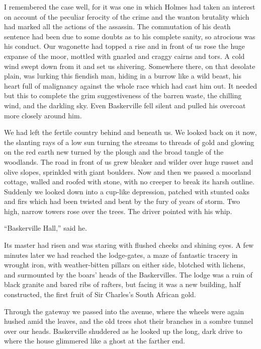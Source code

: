 \documentclass[paper=5.5in:8.5in,BCOR=7mm,twoside,DIV=calc,12pt,usegeometry,openany,chapterprefix,endperiod,headings=big]{scrbook} %
\begin{document}
I remembered the case well, for it was one in which Holmes had taken an interest on account of the peculiar ferocity of the crime and the wanton brutality which had marked all the actions of the assassin. The commutation of his death sentence had been due to some doubts as to his complete sanity, so atrocious was his conduct. Our wagonette had topped a rise and in front of us rose the huge expanse of the moor, mottled with gnarled and craggy cairns and tors. A cold wind swept down from it and set us shivering. Somewhere there, on that desolate plain, was lurking this fiendish man, hiding in a burrow like a wild beast, his heart full of malignancy against the whole race which had cast him out. It needed but this to complete the grim suggestiveness of the barren waste, the chilling wind, and the darkling sky. Even Baskerville fell silent and pulled his overcoat more closely around him.

We had left the fertile country behind and beneath us. We looked back on it now, the slanting rays of a low sun turning the streams to threads of gold and glowing on the red earth new turned by the plough and the broad tangle of the woodlands. The road in front of us grew bleaker and wilder over huge russet and olive slopes, sprinkled with giant boulders. Now and then we passed a moorland cottage, walled and roofed with stone, with no creeper to break its harsh outline. Suddenly we looked down into a cup-like depression, patched with stunted oaks and firs which had been twisted and bent by the fury of years of storm. Two high, narrow towers rose over the trees. The driver pointed with his whip.

\enquote{Baskerville Hall,} said he.

Its master had risen and was staring with flushed cheeks and shining eyes. A few minutes later we had reached the lodge-gates, a maze of fantastic tracery in wrought iron, with weather-bitten pillars on either side, blotched with lichens, and surmounted by the boars' heads of the Baskervilles. The lodge was a ruin of black granite and bared ribs of rafters, but facing it was a new building, half constructed, the first fruit of Sir Charles's South African gold.

Through the gateway we passed into the avenue, where the wheels were again hushed amid the leaves, and the old trees shot their branches in a sombre tunnel over our heads. Baskerville shuddered as he looked up the long, dark drive to where the house glimmered like a ghost at the farther end.
\end{document}
